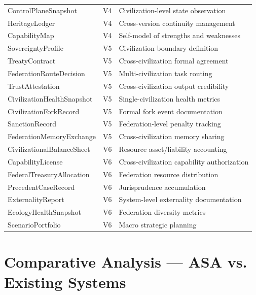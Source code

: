 \documentclass[12pt,a4paper]{article}
\begin{document}
\begin{table}[htbp]
\begin{tabular}{lll}
ControlPlaneSnapshot & V4 & Civilization-level state observation \\
HeritageLedger & V4 & Cross-version continuity management \\
CapabilityMap & V4 & Self-model of strengths and weaknesses \\
SovereigntyProfile & V5 & Civilization boundary definition \\
TreatyContract & V5 & Cross-civilization formal agreement \\
FederationRouteDecision & V5 & Multi-civilization task routing \\
TrustAttestation & V5 & Cross-civilization output credibility \\
CivilizationHealthSnapshot & V5 & Single-civilization health metrics \\
CivilizationForkRecord & V5 & Formal fork event documentation \\
SanctionRecord & V5 & Federation-level penalty tracking \\
FederationMemoryExchange & V5 & Cross-civilization memory sharing \\
CivilizationalBalanceSheet & V6 & Resource asset/liability accounting \\
CapabilityLicense & V6 & Cross-civilization capability authorization \\
FederalTreasuryAllocation & V6 & Federation resource distribution \\
PrecedentCaseRecord & V6 & Jurisprudence accumulation \\
ExternalityReport & V6 & System-level externality documentation \\
EcologyHealthSnapshot & V6 & Federation diversity metrics \\
ScenarioPortfolio & V6 & Macro strategic planning \\
\bottomrule
\end{tabular}
\end{table}


\section{Comparative Analysis --- ASA vs. Existing Systems}
\end{document}
